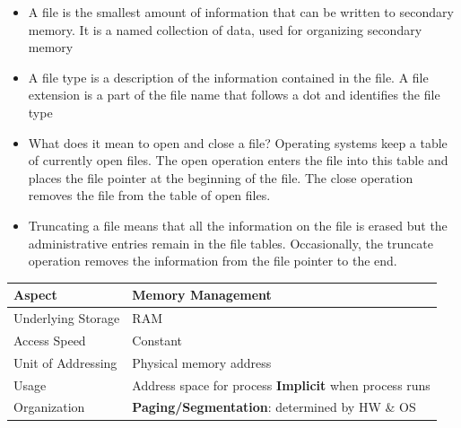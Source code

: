 \documentclass[8pt,twocolumn]{article}
\begin{document}
\begin{itemize}
    \setlength{\itemsep}{0pt} %
    \setlength{\parskip}{0pt}
    \item A file is the smallest amount of information that can be written to secondary memory.
    It is a named collection of data, used for organizing secondary memory
    \item A file type is a description of the information contained in the file. A file extension is
    a part of the file name that follows a dot and identifies the file type
    \item What does it mean to open and close a file?
Operating systems keep a table of currently open files. The open operation enters the
file into this table and places the file pointer at the beginning of the file. The close
operation removes the file from the table of open files.
    \item Truncating a file means that all the information on the file is erased but the
    administrative entries remain in the file tables. Occasionally, the truncate operation
    removes the information from the file pointer to the end.
\end{itemize}
\begin{table}[h!]
    \centering
    \renewcommand{\arraystretch}{0.6}
    \begin{tabular}{|l|p{6cm}|}
    \hline
    \textbf{Aspect} & \textbf{Memory Management} \\
    \hline
    Underlying Storage & RAM \\
    \hline
    Access Speed & Constant \\
    \hline
    Unit of Addressing & Physical memory address \\
    \hline
    Usage & Address space for process \newline \textbf{Implicit} when process runs \\
    \hline
    Organization & \textbf{Paging/Segmentation}: determined by HW \& OS \\
    \hline
    \end{tabular}
    \end{table}
\end{document}
